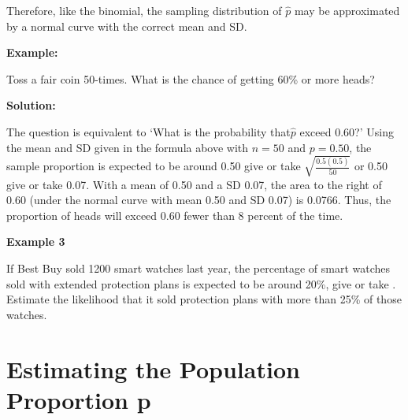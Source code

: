 \documentclass[11pt, chapterprefix=true]{scrbook}\usepackage[]{graphicx}\usepackage[]{color}
\begin{document}
Therefore, like the binomial, the sampling distribution of $\hat{p}$ may be approximated by a normal curve with the correct mean and SD.

\begin{minipage}[ht]{3cm}


\textbf{Example:}
\end{minipage}
\begin{minipage}[ht]{11cm}

\parbox{11cm}{Toss a fair coin 50-times.  What is the chance of getting 60\% or more heads?
}
\end{minipage}

\begin{minipage}[ht]{3cm}

\vspace{-28mm}

\textbf{Solution:}
\end{minipage}
\begin{minipage}[ht]{11cm}

\parbox{11cm}{
The question is equivalent to `What is the probability that$\hat{p}$ exceed 0.60?'  Using the mean and SD given in the formula above with $n = 50$ and $p = 0.50$, the sample proportion is expected to be around 0.50 give or take $\sqrt{\frac{0.5 (0.5)}{50}}$ or 0.50 give or take 0.07.  With a mean of 0.50 and a SD 0.07, the area to the right of 0.60 (under the normal curve with mean 0.50 and SD 0.07) is 0.0766.  Thus, the proportion of heads will exceed 0.60 fewer than 8 percent of the time.

}
\end{minipage}

\begin{minipage}[ht]{3cm}

\vspace{-14mm}

\textbf{Example 3}
\end{minipage}
\begin{minipage}[ht]{11cm}

\parbox{11cm}{
If Best Buy sold 1200 smart watches last year, the percentage of smart watches sold with extended protection plans is expected to be around 20\%, give or take \underline{\phantom{xxxxxx}}.  Estimate the likelihood that it sold protection plans with more than 25\% of those watches.
}
\end{minipage}

\section{Estimating the Population Proportion p}
\end{document}
